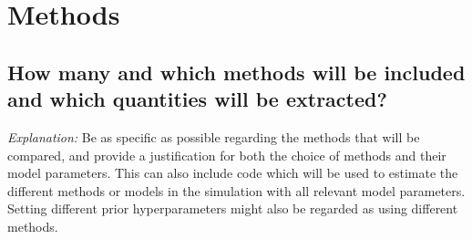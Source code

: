 \documentclass[12pt]{article}
\begin{document}
\section{Methods}
\subsection{How many and which methods will be included and which quantities will be extracted?}
    
\textit{Explanation:} Be as specific as possible regarding the methods that will be compared, and provide a justification for both the choice of methods and their model parameters. This can also include code which will be used to estimate the different methods or models in the simulation with all relevant model parameters. Setting different prior hyperparameters might also be regarded as using different methods. 
    
\end{document}
